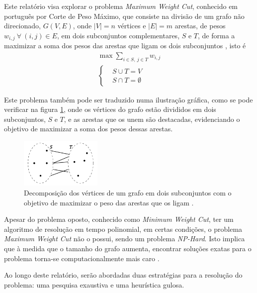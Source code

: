 \documentclass[mirror]{revdetua}
\begin{document}
Este relatório visa explorar o problema \textit{Maximum Weight Cut}, conhecido em português por Corte de Peso Máximo, que consiste na divisão de um grafo não direcionado, $G(V, E)$, onde $|V| = n$ vértices e $|E| = m$ arestas, de pesos $w_{i,j}\ \forall\ (i,j) \in E$, em dois subconjuntos complementares, $S$ e $T$, de forma a maximizar a soma dos pesos das arestas que ligam os dois subconjuntos \cite{SC03}, isto é
\begin{equation*}
    \begin{split}
        \max \sum_{i \in S,\ j \in T} w_{i,j} \\ 
        \left\{\begin{split}
            &S \cup T = V \\
            &S \cap T = \emptyset
        \end{split}\right.
    \end{split}
\end{equation*}

Este problema também pode ser traduzido numa ilustração gráfica, como se pode verificar na figura \ref{fig:problem}, onde os vértices do grafo estão divididos em dois subconjuntos, $S$ e $T$, e as arestas que os unem são destacadas, evidenciando o objetivo de maximizar a soma dos pesos dessas arestas.

\begin{figure}[h]
    \centering
    \includegraphics[width=0.35\textwidth]{../assets/problem.png}
    \caption{Decomposição dos vértices de um grafo em dois subconjuntos com o objetivo de maximizar o peso das arestas que os ligam \cite{SS23}.}
    \label{fig:problem}
\end{figure}

Apesar do problema oposto, conhecido como \textit{Minimum Weight Cut}, ter um algoritmo de resolução em tempo polinomial, em certas condições, o problema \textit{Maximum Weight Cut} não o possui, sendo um problema \textit{NP-Hard}. Isto implica que à medida que o tamanho do grafo aumenta, encontrar soluções exatas para o problema torna-se computacionalmente mais caro \cite{SS23}.

Ao longo deste relatório, serão abordadas duas estratégias para a resolução do problema: uma pesquisa exaustiva e uma heurística gulosa.
\end{document}
